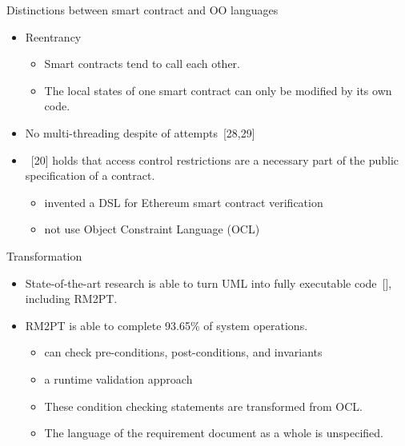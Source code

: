 \documentclass[xcolor=svgnames]{beamer}
\begin{document}
\begin{frame}{Distinctions between smart contract and OO languages}

\begin{itemize}
\item Reentrancy
	\begin{itemize}
	\item Smart contracts tend to call each other.
	\item The local states of one smart contract can only be modified by its own code.
	\end{itemize}

\item No multi-threading despite of attempts~[28,29]

\item {}~[20] holds that access control restrictions are a necessary part of the public specification of a contract.
\begin{itemize}
\item invented a DSL for Ethereum smart contract verification
\item not use Object Constraint Language (OCL)
\end{itemize}
\end{itemize}
\end{frame}


\begin{frame}{Transformation}

\begin{itemize}
\item State-of-the-art research is able to turn UML into fully executable code~[], including RM2PT.
\item RM2PT is able to complete 93.65\% of system operations.
\begin{itemize}
\item can check pre-conditions, post-conditions, and invariants
\item a runtime validation approach
\item<2-> These condition checking statements are transformed from OCL.
\item<3-> The language of the requirement document as a whole is unspecified.
\end{itemize}

\end{itemize}

\end{frame}
\end{document}
